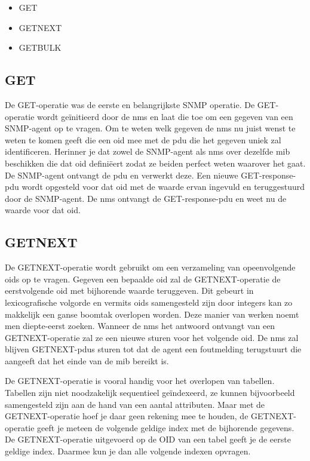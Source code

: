 \begin{itemize}
	\item GET
	\item GETNEXT
	\item GETBULK
\end{itemize}


\subsection{GET}
De GET-operatie was de eerste en belangrijkste SNMP operatie.
De GET-operatie wordt geïnitieerd door de \gls{nms} en laat die toe om een gegeven van een SNMP-agent op te vragen.
Om te weten welk gegeven de \gls{nms} nu juist wenst te weten te komen geeft die een \gls{oid} mee met de \gls{pdu} die het gegeven uniek zal identificeren.
Herinner je dat zowel de SNMP-agent als \gls{nms} over dezelfde \gls{mib} beschikken die dat \gls{oid} definiëert zodat ze beiden perfect weten waarover het gaat.
De SNMP-agent ontvangt de \gls{pdu} en verwerkt deze. Een nieuwe GET-response-\gls{pdu} wordt opgesteld voor dat \gls{oid} met de waarde ervan ingevuld en
teruggestuurd door de SNMP-agent. De \gls{nms} ontvangt de GET-response-\gls{pdu} en weet nu de waarde voor dat \gls{oid}.



\subsection{GETNEXT}
\label{snmp-getnext}
De GETNEXT-operatie wordt gebruikt om een verzameling van opeenvolgende \glspl{oid} op te vragen.
Gegeven een bepaalde \gls{oid} zal de GETNEXT-operatie de eerstvolgende \gls{oid} met bijhorende waarde teruggeven.
Dit gebeurt in lexicografische volgorde en vermits \glspl{oid} samengesteld zijn door integers kan zo makkelijk een ganse boomtak overlopen worden.
Deze manier van werken noemt men diepte-eerst zoeken.\cite{essentialsnmp}
Wanneer de \gls{nms} het antwoord ontvangt van een GETNEXT-operatie zal ze een nieuwe sturen voor het volgende \gls{oid}.
De \gls{nms} zal blijven GETNEXT-\glspl{pdu} sturen tot dat de agent een foutmelding terugstuurt die aangeeft dat het einde van de \gls{mib} bereikt is.

De GETNEXT-operatie is vooral handig voor het overlopen van tabellen.
Tabellen zijn niet noodzakelijk sequentieel geïndexeerd, ze kunnen bijvoorbeeld samengesteld zijn aan de hand van een aantal attributen.
Maar met de GETNEXT-operatie hoef je daar geen rekening mee te houden, de GETNEXT-operatie geeft je meteen de volgende geldige index met de bijhorende gegevens.
De GETNEXT-operatie uitgevoerd op de OID van een tabel geeft je de eerste geldige index.
Daarmee kun je dan alle volgende indexen opvragen.


